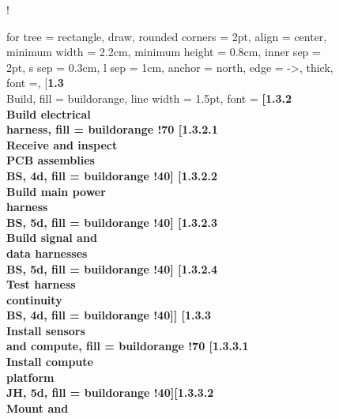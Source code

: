 \begin{figure}[H]
\centering
\resizebox{\textwidth} { ! }
{
\begin { forest }
  for
    tree =
        {
            rectangle,
            draw,
            rounded corners = 2pt,
            align = center,
            minimum width = 2.2cm,
            minimum height = 0.8cm,
            inner sep = 2pt,
            s sep = 0.3cm,
            l sep = 1cm,
            anchor = north,
            edge = {->, thick},
            font =\scriptsize,
        }[{\textbf{1.3}\\Build}, fill = buildorange, line width = 1.5pt,
          font =\scriptsize\bfseries
              [{\textbf{1.3.2}\\Build electrical\\harness},
               fill = buildorange !70
                   [{\textbf{1.3.2.1}\\Receive and
                        inspect\\PCB assemblies\\{\tiny BS, 4d}},
                    fill = buildorange !40]
                   [{\textbf{1.3.2.2}\\Build main power\\harness\\{\tiny BS,
                                                                   5d}},
                    fill = buildorange !40]
                   [{\textbf{1.3.2.3}\\Build signal and\\data
                            harnesses\\{\tiny BS, 5d}},
                    fill = buildorange !40]
                   [{\textbf{1.3.2.4}\\Test harness\\continuity\\{\tiny BS,
                                                                  4d}},
                    fill = buildorange !40]]
              [{\textbf{1.3.3}\\Install sensors\\and compute},
               fill = buildorange !70
                   [{\textbf{1.3.3.1}\\Install compute\\platform\\{\tiny JH,
                                                                   5d}},
                    fill = buildorange !40][{\textbf{1.3.3.2}\\Mount and
}
\end{ forest }}
\end{figure}
